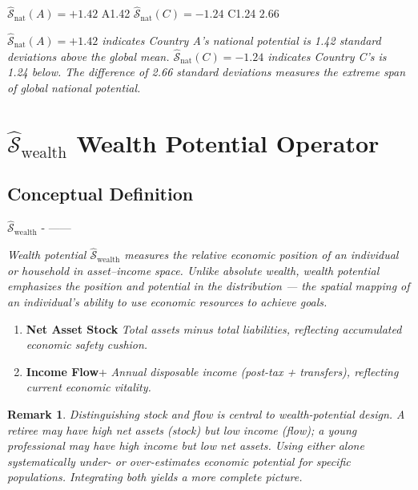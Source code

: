 \documentclass[11pt,a4paper]{article}
\theoremstyle{definition}
\newtheorem{remark}{ Remark}[section]
\newcommand{\Sopnat}{\hat{\mathcal{S}}_{\text{nat}}}
\newcommand{\Sopwealth}{\hat{\mathcal{S}}_{\text{wealth}}}
\begin{document}
\noindent $\Sopnat(A) = +1.42$ A1.42
$\Sopnat(C) = -1.24$ C1.24
 $2.66$ 

\medskip
\noindent\textit{$\Sopnat(A) = +1.42$ indicates Country A's national potential is 1.42 standard deviations above the global mean. $\Sopnat(C) = -1.24$ indicates Country C's is 1.24 below. The difference of 2.66 standard deviations measures the extreme span of global national potential.}

\section{ $\Sopwealth$ Wealth Potential Operator}

\subsection{ Conceptual Definition}

 $\Sopwealth$ -
\textit{}\textit{}——


\medskip
\noindent\textit{Wealth potential $\Sopwealth$ measures the relative economic position of an individual or household in asset--income space. Unlike absolute wealth, wealth potential emphasizes the \textit{position} and \textit{potential} in the distribution — the spatial mapping of an individual's ability to use economic resources to achieve goals.}

\bigskip

\begin{enumerate}[leftmargin=*,label=\textbf{(\arabic*)}]
    \item \textbf{ Net Asset Stock}
    \textit{Total assets minus total liabilities, reflecting accumulated economic safety cushion.}
    
    \item \textbf{ Income Flow}+
    \textit{Annual disposable income (post-tax + transfers), reflecting current economic vitality.}
\end{enumerate}

\begin{remark}



\textit{Distinguishing stock and flow is central to wealth-potential design. A retiree may have high net assets (stock) but low income (flow); a young professional may have high income but low net assets. Using either alone systematically under- or over-estimates economic potential for specific populations. Integrating both yields a more complete picture.}
\end{remark}
\end{document}
